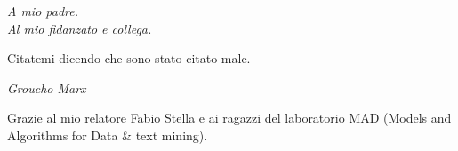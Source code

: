 \documentclass[11pt]{toptesi}
\begin{document}
	





\frontmatter

\begin{flushright}
\noindent
\textit{A mio padre. }\\
\textit{Al mio fidanzato e collega. }
\end{flushright}
\cleardoublepage


\begin{flushright}
\noindent
Citatemi dicendo che sono stato citato male.

\textit{Groucho Marx}
\end{flushright}
\cleardoublepage


\ringraziamenti
Grazie al mio relatore Fabio Stella e ai ragazzi del laboratorio MAD (Models and Algorithms for Data \& text mining).

\end{document}
